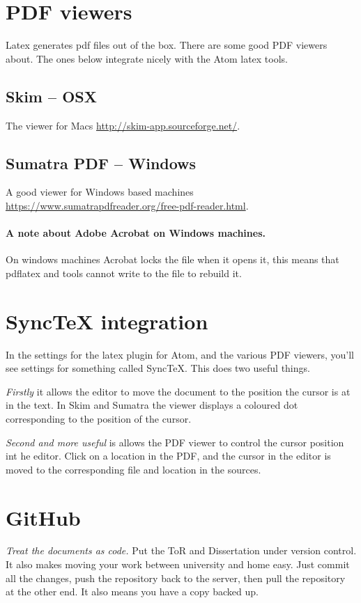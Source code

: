 \section{PDF viewers}
Latex generates pdf files out of the box.  There are some good PDF viewers about.  The ones below integrate nicely with the Atom latex tools.
\subsection{Skim -- OSX}
The viewer for Macs \url{http://skim-app.sourceforge.net/}.
\subsection{Sumatra PDF -- Windows}
A good viewer for Windows based machines\\ \url{https://www.sumatrapdfreader.org/free-pdf-reader.html}.

\paragraph{A note about Adobe Acrobat on  Windows machines.}
On windows machines Acrobat locks the file when it opens it, this means that pdflatex and tools cannot write to the file to rebuild it.

\section{SyncTeX integration}
In the settings for the latex plugin for Atom, and the various PDF viewers, you'll see settings for something called SyncTeX.  This does two useful things.

\emph{Firstly} it allows the editor to move the document to the position the cursor is at in the text.  In Skim and Sumatra the viewer displays a coloured dot corresponding to the position of the cursor.

\emph{Second and more useful} is allows the PDF viewer to control the cursor position int he editor.  Click on a location in the PDF, and the cursor in the editor is moved to the corresponding file and location in the sources.

\section{GitHub}
\emph{Treat the documents as code.}
Put the ToR and Dissertation under version control.  It also makes moving your work between university and home easy.  Just commit all the changes, push the repository back to the server, then pull the repository at the other end.  It also means you have a copy backed up.

